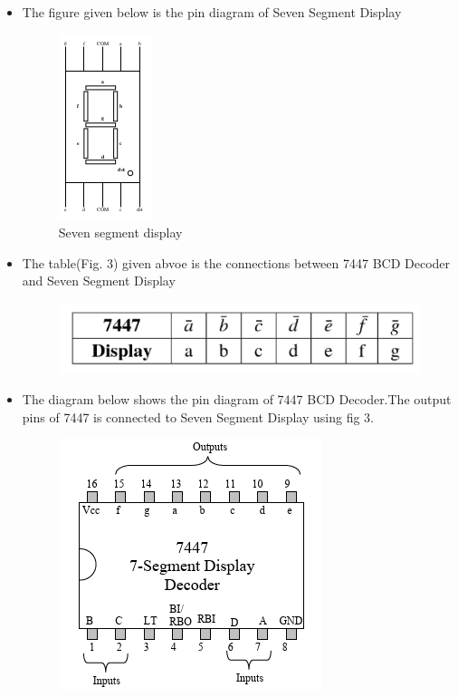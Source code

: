 \documentclass[journal,12pt,twocolumn]{IEEEtran}
\begin{document}
\begin{itemize}
    \item The figure given below is the pin diagram of Seven Segment Display
    \begin{figure}[h]
    \centering
    \includegraphics{../figures/seven.png}
    \caption{Seven segment display}
    \label{fig:my_label}
    \end{figure}
   \item  The table(Fig. 3) given abvoe is the connections between 7447 BCD Decoder and Seven Segment Display
   \begin{figure}
       \centering
       \includegraphics[scale=0.5]{../figures/sevenseg.png}
       \caption{}
       \label{fig:my_label}
   \end{figure}

    \item The diagram below shows the pin diagram of 7447 BCD Decoder.The output pins of 7447 is connected to Seven Segment Display using fig 3.
    \begin{figure}[h]
    \centering
    \includegraphics[scale=0.5]{../figures/ic7447.png}
    \caption{}
    \label{fig:my_label}
    \end{figure}
\end{itemize}
\end{document}
